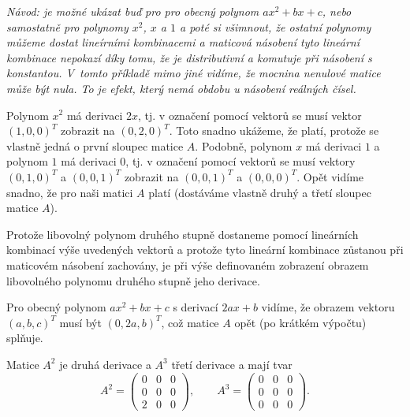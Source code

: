 \textit{Návod: je možné ukázat buď pro pro obecný polynom $ax^2+bx+c$, nebo samostatně pro polynomy  $x^2$, $x$ a $1$ a poté si všimnout, že ostatní polynomy můžeme dostat lineírními kombinacemi a maticová násobení tyto lineární kombinace nepokazí díky tomu, že je distributivní a komutuje při násobení s konstantou.
 V tomto příkladě mimo jiné vidíme, že mocnina nenulové matice může být nula. To je efekt, který nemá obdobu u násobení reálných čísel.}


\reseni Polynom $x^2$ má derivaci $2x$, tj. v označení pomocí vektorů
se musí vektor $(1,0,0)^T$ zobrazit na $(0,2,0)^T$. Toto snadno
ukážeme, že platí, protože se vlastně jedná o první sloupec matice
$A$. Podobně, polynom $x$ má derivaci $1$ a polynom $1$ má derivaci
$0$, tj. v označení pomocí vektorů se musí vektory $(0,1,0)^T$ a
$(0,0,1)^T$ zobrazit na $(0,0,1)^T$ a $(0,0,0)^T$. Opět vidíme snadno,
že pro naši matici $A$ platí (dostáváme vlastně druhý a třetí sloupec
matice $A$).

Protože libovolný polynom druhého stupně dostaneme pomocí lineárních
kombinací výše uvedených vektorů a protože tyto lineární kombinace
zůstanou při maticovém násobení zachovány, je při výše definovaném
zobrazení obrazem libovolného polynomu druhého stupně jeho derivace.

Pro obecný polynom $ax^2+bx+c$ s derivací $2ax+b$ vidíme, že obrazem
vektoru $(a,b,c)^T$ musí být $(0,2a, b)^T$, což matice $A$ opět (po
krátkém výpočtu) splňuje.

Matice $A^2$ je druhá derivace a $A^3$ třetí derivace a mají tvar
\begin{equation*}
  A^2=
  \begin{pmatrix}
  0 & 0 & 0 \\
  0 & 0 & 0 \\
  2 & 0 & 0
\end{pmatrix}, \qquad
  A^3=
  \begin{pmatrix}
  0 & 0 & 0 \\
  0 & 0 & 0 \\
  0 & 0 & 0
\end{pmatrix}.
\end{equation*}


\konec


\stranka

